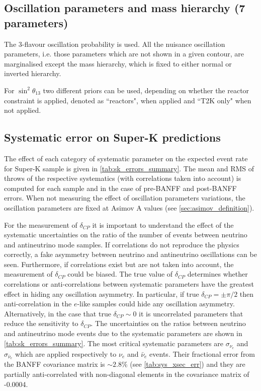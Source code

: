 \FloatBarrier
\clearpage

\subsection{Oscillation parameters and mass hierarchy (7 parameters)}

The 3-flavour oscillation probability is used.  All the nuisance oscillation parameters, i.e. those parameters which are not shown in a given contour, are marginalised except the mass hierarchy, which is fixed to either normal or inverted hierarchy.

For $\sin^2 \theta_{13}$ two different priors can be used, depending on whether the reactor constraint is applied, denoted as ``reactors", when applied and ``T2K only" when not applied.



\subsection{Systematic error on Super-K predictions}
\label{sec:systematics:errortables}

The effect of each category of systematic parameter on the expected event rate for Super-K sample is given in \cref{tab:sk_errors_summary}. The mean and RMS of \NumToysSmall throws of the respective systematics (with correlations taken into account) is computed for each sample and in the case of pre-BANFF and post-BANFF errors. When not measuring the effect of oscillation parameters variations, the oscillation parameters are fixed at Asimov A values (see \cref{sec:asimov_definition}).

For the measurement of $\delta_{CP}$ it is important to understand the effect of the systematic uncertainties on the ratio of the number of events between neutrino and antineutrino mode samples. If correlations do not reproduce the physics correctly, a fake asymmetry between neutrino and antineutrino oscillations can be seen. Furthermore, if correlations exist but are not taken into account, the measurement of $\delta_{CP}$ could be biased. The true value of $\delta_{CP}$ determines whether correlations or anti-correlations between systematic parameters have the greatest effect in hiding any oscillation asymmetry. In particular, if true $\delta_{CP} = \pm \pi/2$ then anti-correlation in the $e$-like samples could hide any oscillation asymmetry. Alternatively, in the case that true $\delta_{CP} \sim 0$ it is uncorrelated parameters that reduce the sensitivity to $\delta_{CP}$. The uncertainties on the ratios between neutrino and antineutrino mode events due to the systematic parameters are shown in \cref{tab:sk_errors_summary}. The most critical systematic parameters are $\sigma_{\nu_e}$ and $\sigma_{\bar{\nu}_e}$ which are applied respectively to $\nu_e$ and $\bar{\nu}_e$ events. Their fractional error from the BANFF covariance matrix is $\sim2.8$\% (see \cref{tab:sys_xsec_err}) and they are partially anti-correlated with non-diagonal elements in the covariance matrix of -0.0004.

